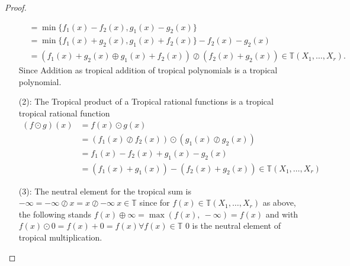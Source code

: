 \documentclass{article}
\theoremstyle{definition}
\newtheorem{comment}[theorem]{Comment}
\begin{document}
\begin{proof}
\begin{itemize}
\begin{align*}
&= \min\{f_1(x) - f_2(x), g_1(x) - g_2(x) \} \\
&= \min\{f_1(x) + g_2(x), g_1(x) + f_2(x) \} - f_2(x) - g_2(x) \\
&= (f_1(x) + g_2(x) \oplus g_1(x) + f_2(x)) \oslash (f_2(x) + g_2(x)) \in \mathbb{T}(X_1, \dots , X_r).
\end{align*}
Since Addition as tropical addition of tropical polynomials is a tropical polynomial.
\item[(2):]
The Tropical product of a Tropical rational functions is a tropical tropical rational function
\begin{align*}
(f \odot g)(x) &= f(x) \odot g(x) \\
&=  (f_1(x) \oslash f_2(x)) \odot (g_1(x) \oslash g_2(x)) \\
&= f_1(x) - f_2(x) + g_1(x) - g_2(x) \\
&= (f_1(x) + g_1(x)) - (f_2(x) + g_2(x)) \in \mathbb{T}(X_1, \dots , X_r)
\end{align*}
\item[(3):]
The neutral element for the tropical sum is $- \infty = - \infty \oslash x = x \oslash - \infty \ x \in \mathbb{T}$ since for $f(x) \in \mathbb{T}(X_1, \dots , X_r)$ as above, the following stands $ f(x) \oplus \infty = \max(f(x),\ - \infty) = f(x)$ and with $f(x) \odot 0 = f(x) + 0 = f(x) \forall f(x) \in \mathbb{T}$ $0$ is the neutral element of tropical multiplication.
\end{itemize}
\end{proof}

\end{document}
